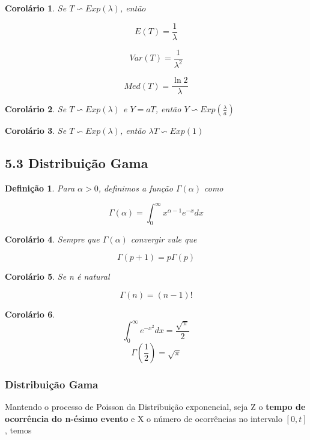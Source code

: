 \documentclass[12pt]{article}
\newtheorem{corollary}{Corolário}[theorem]
\newtheorem{definition}{Definição}
\begin{document}
\begin{corollary}
    Se $T \backsim Exp(\lambda)$, então
    
    $$E(T) = \dfrac{1}{\lambda}$$
    
    $$Var(T) = \dfrac{1}{\lambda^2}$$
    
    $$Med(T) = \dfrac{\ln 2}{\lambda}$$
\end{corollary}
                            
\begin{corollary}
    Se $T \backsim Exp(\lambda)$ e $Y = a T$, então $Y \backsim Exp(\frac{\lambda}{a})$

\end{corollary}

\begin{corollary}
    Se $T \backsim Exp(\lambda)$, então $\lambda T \backsim Exp(1)$
\end{corollary}

\subsection*{5.3 Distribuição Gama}
\begin{definition}
    Para $\alpha > 0$, definimos a função $\Gamma(\alpha)$ como
    
    $$\Gamma(\alpha) = \int_0^\infty x^{\alpha - 1} e^{-x} d x$$
\end{definition}

\begin{corollary}
    Sempre que $\Gamma(\alpha)$ convergir vale que
    
    $$\Gamma(p + 1) = p \Gamma(p)$$
\end{corollary}

\begin{corollary}
    Se n é natural
    
    $$\Gamma(n) = (n-1)!$$
\end{corollary}

\begin{corollary}
    $$\int_0^\infty e^{-x^2} d x = \frac{\sqrt{\pi}}{2}$$
    $$\Gamma \left (\frac{1}{2} \right ) = \sqrt{\pi}$$
\end{corollary}

\subsubsection*{Distribuição Gama}
Mantendo o processo de Poisson da Distribuição exponencial, seja Z o \textbf{tempo de ocorrência do n-ésimo evento} e X o número de ocorrências no intervalo $[0, t]$, temos
\end{document}
